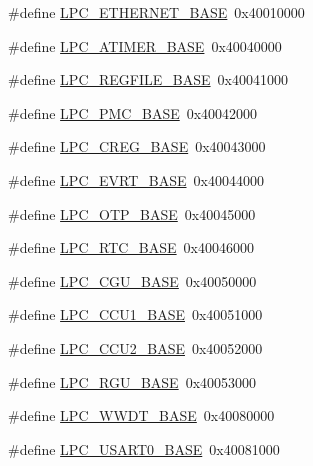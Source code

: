 \begin{DoxyCompactItemize}
\item 
\#define \hyperlink{group___p_e_r_i_p_h__18_x_x___b_a_s_e_ga7da6912c1d137fdfb86cedc9efb8c8d6}{L\+P\+C\+\_\+\+E\+T\+H\+E\+R\+N\+E\+T\+\_\+\+B\+A\+SE}~0x40010000
\item 
\#define \hyperlink{group___p_e_r_i_p_h__18_x_x___b_a_s_e_gaccf3a9c6522b5cfc6d9ddc21f0500ec0}{L\+P\+C\+\_\+\+A\+T\+I\+M\+E\+R\+\_\+\+B\+A\+SE}~0x40040000
\item 
\#define \hyperlink{group___p_e_r_i_p_h__18_x_x___b_a_s_e_gad2674eff10cea9243ab060ad1fbac9d2}{L\+P\+C\+\_\+\+R\+E\+G\+F\+I\+L\+E\+\_\+\+B\+A\+SE}~0x40041000
\item 
\#define \hyperlink{group___p_e_r_i_p_h__18_x_x___b_a_s_e_gad729bfbe3e327b259732dd0817d6e34b}{L\+P\+C\+\_\+\+P\+M\+C\+\_\+\+B\+A\+SE}~0x40042000
\item 
\#define \hyperlink{group___p_e_r_i_p_h__18_x_x___b_a_s_e_ga862ac15bfc87b2a8525acacccedfba61}{L\+P\+C\+\_\+\+C\+R\+E\+G\+\_\+\+B\+A\+SE}~0x40043000
\item 
\#define \hyperlink{group___p_e_r_i_p_h__18_x_x___b_a_s_e_ga921b2ba31c8defad6d1c44ca9406e893}{L\+P\+C\+\_\+\+E\+V\+R\+T\+\_\+\+B\+A\+SE}~0x40044000
\item 
\#define \hyperlink{group___p_e_r_i_p_h__18_x_x___b_a_s_e_ga611c7ec908d7802a811bd8a06163d05c}{L\+P\+C\+\_\+\+O\+T\+P\+\_\+\+B\+A\+SE}~0x40045000
\item 
\#define \hyperlink{group___p_e_r_i_p_h__18_x_x___b_a_s_e_ga4618213cf968f8245814d7d3e7aa2e2e}{L\+P\+C\+\_\+\+R\+T\+C\+\_\+\+B\+A\+SE}~0x40046000
\item 
\#define \hyperlink{group___p_e_r_i_p_h__18_x_x___b_a_s_e_ga560da3a74764a9e89bef655f3daa8b0e}{L\+P\+C\+\_\+\+C\+G\+U\+\_\+\+B\+A\+SE}~0x40050000
\item 
\#define \hyperlink{group___p_e_r_i_p_h__18_x_x___b_a_s_e_gaf7df220ef74f9e793259c495db5e5956}{L\+P\+C\+\_\+\+C\+C\+U1\+\_\+\+B\+A\+SE}~0x40051000
\item 
\#define \hyperlink{group___p_e_r_i_p_h__18_x_x___b_a_s_e_gab3b7e06c5e7e1913c555e584e2092f21}{L\+P\+C\+\_\+\+C\+C\+U2\+\_\+\+B\+A\+SE}~0x40052000
\item 
\#define \hyperlink{group___p_e_r_i_p_h__18_x_x___b_a_s_e_gaff6de015a63620b4c552891c1ac9f756}{L\+P\+C\+\_\+\+R\+G\+U\+\_\+\+B\+A\+SE}~0x40053000
\item 
\#define \hyperlink{group___p_e_r_i_p_h__18_x_x___b_a_s_e_ga9b83c39ba53f9c9e87974984c96e35de}{L\+P\+C\+\_\+\+W\+W\+D\+T\+\_\+\+B\+A\+SE}~0x40080000
\item 
\#define \hyperlink{group___p_e_r_i_p_h__18_x_x___b_a_s_e_gaa878cf5cffe359eaf1eba511ab537ba9}{L\+P\+C\+\_\+\+U\+S\+A\+R\+T0\+\_\+\+B\+A\+SE}~0x40081000

\end{DoxyCompactItemize}
